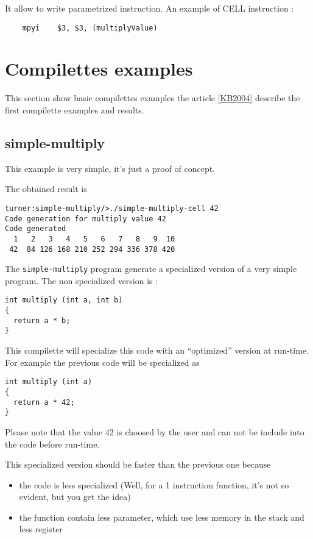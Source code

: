 \documentclass{article}
\begin{document}
It allow to write parametrized instruction. An example of CELL
instruction :
\begin{verbatim}
	mpyi    $3, $3, (multiplyValue) 
\end{verbatim}

\section{Compilettes examples}

This section show basic compilettes examples the article \ref{KB2004}
describe the first compilette examples and results.

\subsection{simple-multiply}

This example is very simple, it's just a proof of concept.

The obtained result is
\begin{verbatim}
turner:simple-multiply/>./simple-multiply-cell 42
Code generation for multiply value 42
Code generated
  1   2   3   4   5   6   7   8   9  10 
 42  84 126 168 210 252 294 336 378 420 
\end{verbatim}

The \texttt{simple-multiply} program generate a specialized version of
a very simple program. The non specialized version is :
\begin{verbatim}
int multiply (int a, int b)
{
  return a * b;
}
\end{verbatim}

This compilette will specialize this code with an ``optimized''
version at run-time. For example the previous code will be specialized
as
\begin{verbatim}
int multiply (int a)
{
  return a * 42;
}
\end{verbatim}

Please note that the value 42 is choosed by the user and can not be
include into the code before run-time.

This specialized version should be faster than the previous one because
\begin{itemize}
\item the code is less specialized (Well, for a 1 instruction
  function, it's not so evident, but you get the idea)
\item the function contain less parameter, which use less memory in
  the stack and less register
\end{itemize}
\end{document}
